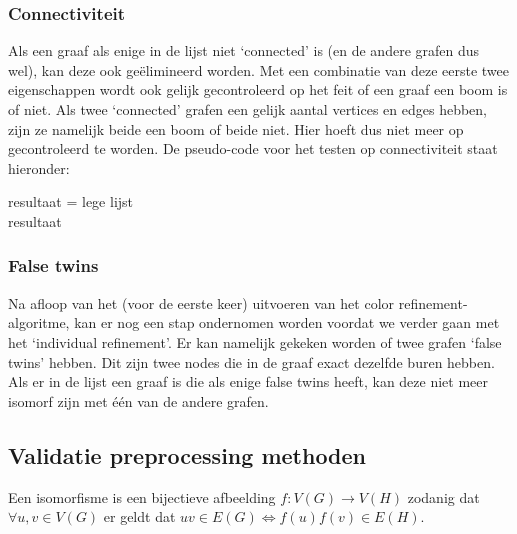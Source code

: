 \documentclass{article}
\begin{document}
\subsubsection{Connectiviteit}
Als een graaf als enige in de lijst niet ‘connected’ is (en de andere grafen dus wel), kan deze ook ge\"elimineerd worden. Met een combinatie van deze eerste twee eigenschappen wordt ook gelijk gecontroleerd op het feit of een graaf een boom is of niet. Als twee ‘connected’ grafen een gelijk aantal vertices en edges hebben, zijn ze namelijk beide een boom of beide niet. Hier hoeft dus niet meer op gecontroleerd te worden. De pseudo-code voor het testen op connectiviteit staat hieronder:\\

\begin{algorithm}[H]
	resultaat = lege lijst\\
	\Return resultaat
\end{algorithm}

\subsubsection{False twins}
Na afloop van het (voor de eerste keer) uitvoeren van het color refinement-algoritme, kan er nog een stap ondernomen worden voordat we verder gaan met het ‘individual refinement’. Er kan namelijk gekeken worden of twee grafen ‘false twins’ hebben. Dit zijn twee nodes die in de graaf exact dezelfde buren hebben. Als er in de lijst een graaf is die als enige false twins heeft, kan deze niet meer isomorf zijn met \'e\'en van de andere grafen.

\subsection{Validatie preprocessing methoden}

Een isomorfisme is een bijectieve afbeelding $f:V(G) \rightarrow V(H)$ zodanig dat $\forall u,v \in V(G)$ er geldt dat $uv \in E(G) \Leftrightarrow f(u)f(v)\in E(H)$.\\
\end{document}
